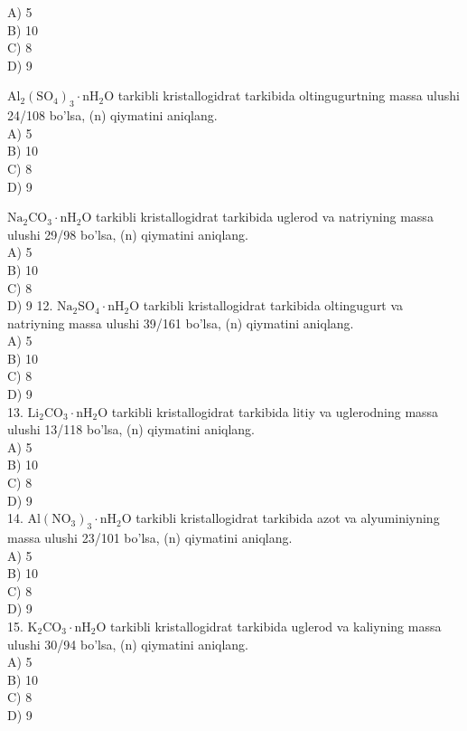 A) 5\\
B) 10\\
C) 8\\
D) 9
  \item $\mathrm{Al}_{2}\left(\mathrm{SO}_{4}\right)_{3} \cdot \mathrm{nH}_{2} \mathrm{O}$ tarkibli kristallogidrat tarkibida oltingugurtning massa ulushi 24/108 bo'lsa, (n) qiymatini aniqlang.\\
A) 5\\
B) 10\\
C) 8\\
D) 9
  \item $\mathrm{Na}_{2} \mathrm{CO}_{3} \cdot \mathrm{nH}_{2} \mathrm{O}$ tarkibli kristallogidrat tarkibida uglerod va natriyning massa ulushi 29/98 bo'lsa, (n) qiymatini aniqlang.\\
A) 5\\
B) 10\\
C) 8\\
D) 9
12. $\mathrm{Na}_{2} \mathrm{SO}_{4} \cdot \mathrm{nH}_{2} \mathrm{O}$ tarkibli kristallogidrat tarkibida oltingugurt va natriyning massa ulushi 39/161 bo'lsa, (n) qiymatini aniqlang.\\
A) 5\\
B) 10\\
C) 8\\
D) 9\\
13. $\mathrm{Li}_{2} \mathrm{CO}_{3} \cdot \mathrm{nH}_{2} \mathrm{O}$ tarkibli kristallogidrat tarkibida litiy va uglerodning massa ulushi 13/118 bo'lsa, (n) qiymatini aniqlang.\\
A) 5\\
B) 10\\
C) 8\\
D) 9\\
14. $\mathrm{Al}\left(\mathrm{NO}_{3}\right)_{3} \cdot \mathrm{nH}_{2} \mathrm{O}$ tarkibli kristallogidrat tarkibida azot va alyuminiyning massa ulushi 23/101 bo'lsa, (n) qiymatini aniqlang.\\
A) 5\\
B) 10\\
C) 8\\
D) 9\\
15. $\mathrm{K}_{2} \mathrm{CO}_{3} \cdot \mathrm{nH}_{2} \mathrm{O}$ tarkibli kristallogidrat tarkibida uglerod va kaliyning massa ulushi 30/94 bo'lsa, (n) qiymatini aniqlang.\\
A) 5\\
B) 10\\
C) 8\\
D) 9\\
